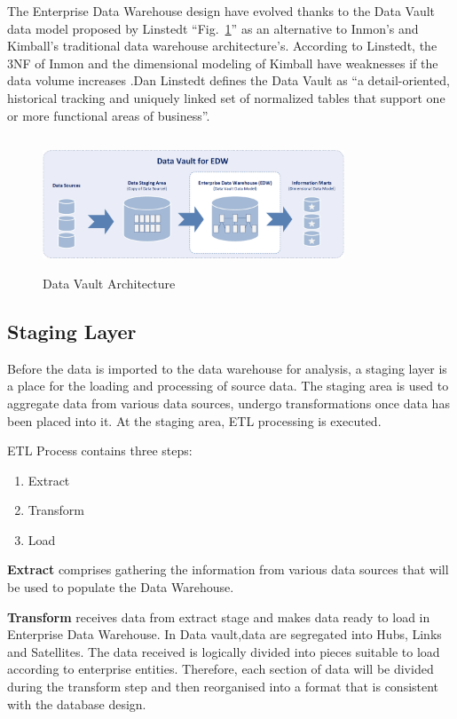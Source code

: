 \documentclass[conference]{IEEEtran}
\begin{document}
The Enterprise Data Warehouse design have evolved thanks to the Data Vault data model proposed by Linstedt ``Fig.~\ref{fig1}'' as an alternative to Inmon's and Kimball's traditional data warehouse architecture's. According to Linstedt, the 3NF of Inmon and the dimensional modeling of Kimball have weaknesses if the data volume increases \cite{b1}.Dan Linstedt defines the Data Vault as “a detail-oriented, historical tracking and uniquely linked set of normalized tables that support one or more functional areas of business”.

\begin{figure}[htbp]
\centerline{\includegraphics[width=9cm, height=4cm]{Figure1.png}}
\caption{Data Vault Architecture}
\label{fig1}
\end{figure}

\subsection{Staging Layer}

Before the data is imported to the data warehouse for analysis, a staging layer is a place for the loading and processing of source data. The staging area is used to aggregate data from various data sources, undergo transformations once data has been placed into it. At the staging area, ETL processing is executed.

\smallskip
\noindent ETL Process contains three steps:

\begin{enumerate}
\item Extract
\item Transform
\item Load
\end{enumerate}

\textbf{Extract} comprises gathering the information from various data sources that will be used to populate the Data Warehouse.

\textbf{Transform} receives data from extract stage and makes data ready to load in Enterprise Data Warehouse. In Data vault,data are segregated into Hubs, Links and Satellites. The data received is logically divided into pieces suitable to load according to enterprise entities. Therefore, each section of data will be divided during the transform step and then reorganised into a format that is consistent with the database design.
\end{document}

